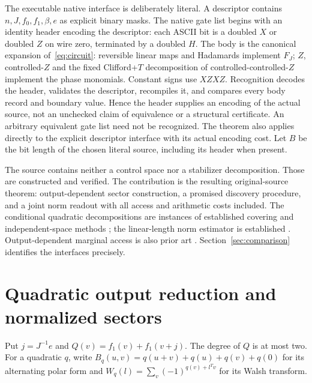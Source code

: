 \documentclass[11pt]{article}
\begin{document}
The executable native interface is deliberately literal. A descriptor contains
$n,J,f_0,f_1,\beta,e$ as explicit binary masks. The native gate list begins with an
identity header encoding the descriptor: each ASCII bit is a doubled $X$ or doubled
$Z$ on wire zero, terminated by a doubled $H$. The body is the canonical expansion
of~\eqref{eq:circuit}: reversible linear maps and Hadamards implement $F_J$;
$Z$, controlled-$Z$ and the fixed Clifford+$T$ decomposition of controlled-controlled-$Z$
implement the phase monomials. Constant signs use $XZXZ$. Recognition decodes the header,
validates the descriptor, recompiles it, and compares every body record and boundary
value. Hence the header supplies an encoding of the actual source, not an unchecked
claim of equivalence or a structural certificate. An arbitrary equivalent gate list
need not be recognized. The theorem also applies directly to the explicit descriptor
interface with its actual encoding cost. Let $B$ be the bit length of the chosen literal
source, including its header when present.

The source contains neither a control space nor a stabilizer decomposition. Those are
constructed and verified. The contribution is the resulting original-source theorem:
output-dependent sector construction, a promised discovery procedure, and a joint norm
readout with all access and arithmetic costs included. The conditional quadratic
decompositions are instances of established covering and independent-space methods
\cite{maslov2024,blaser2026}; the linear-length norm estimator is established
\cite{bravyi2019}. Output-dependent marginal access is also prior art
\cite{park2024,nest2011}. Section~\ref{sec:comparison} identifies the interfaces precisely.

\section{Quadratic output reduction and normalized sectors}\label{sec:sectors}
Put $j=J^{-1}e$ and $Q(v)=f_1(v)+f_1(v+j)$. The degree of $Q$ is at most two.
For a quadratic $q$, write
$B_q(u,v)=q(u+v)+q(u)+q(v)+q(0)$ for its alternating polar form and
$W_q(l)=\sum_v(-1)^{q(v)+l^Tv}$ for its Walsh transform.
\end{document}
